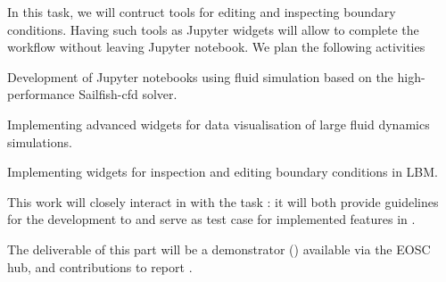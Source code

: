 \begin{task}[
  title=Demonstrator: Visualisation and control of fluid dynamics in Jupyter notebook,
  id=application-gpu,
  lead=SIL,
  PM=13,
  wphases={4-36},
  partners={EGI}
]


In this task, we will contruct tools for editing and inspecting
boundary conditions. Having such tools as Jupyter widgets will allow
to complete the workflow without leaving Jupyter notebook. We plan the
following activities
\begin{compactitem}
\item Development of Jupyter notebooks using fluid
  simulation based on the high-performance Sailfish-cfd solver.
\item Implementing advanced widgets for data visualisation of large
  fluid dynamics simulations.
\item Implementing widgets for inspection and editing boundary
  conditions in LBM.
\end{compactitem}

This work will closely interact in with the task
: it will both provide guidelines
for the development to  and serve
as test case for implemented features in
.

The deliverable of this part will be a demonstrator
() available via the EOSC hub, and
contributions to report .

\end{task}
